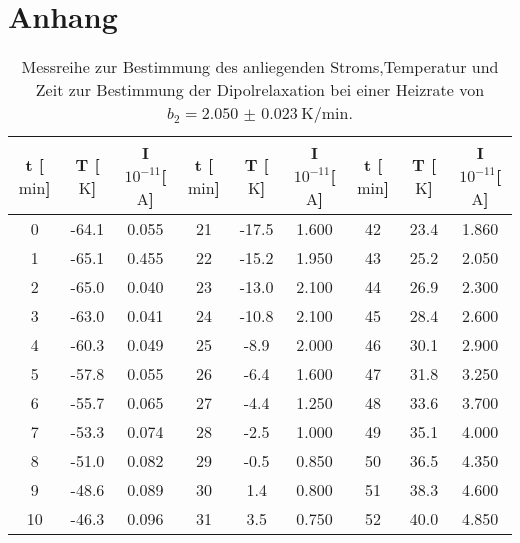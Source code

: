 \newpage
\section{Anhang}

\begin{table}
    \centering
    \caption{Messreihe zur Bestimmung des anliegenden Stroms,\newline Temperatur und Zeit zur Bestimmung der Dipolrelaxation bei einer Heizrate von $b_2 = \SI{2.050(23)}{\kelvin\per\minute}$.} 
    \label{tab:WhoIsBigInJapan?2}
    \begin{tabular}{c c c@{\hskip 0.5cm}||@{\hskip 0.5cm} c c c@{\hskip 0.5cm} ||@{\hskip 0.5cm} c c c}
        \toprule
        t [$\si{\minute}$] & T [$\si{\kelvin}$] &  I $10^{-11}$[$\si{\ampere}$] & t [$\si{\minute}$] & T [$\si{\kelvin}$] &  I $10^{-11}$[$\si{\ampere}$] & t [$\si{\minute}$] & T [$\si{\kelvin}$] &  I $10^{-11}$[$\si{\ampere}$] \\
        \midrule
0    & -64.1   &    0.055 & 21      &  -17.5     &  1.600  &  42  &      23.4  &           1.860 \\
1    & -65.1   &    0.455 & 22      &  -15.2     &  1.950 &  43  &      25.2  &           2.050 \\
2    & -65.0    &    0.040  & 23      &  -13.0       &  2.100  &  44  &      26.9  &           2.300 \\
3    & -63.0     &    0.041 & 24      &  -10.8     &  2.100  &  45  &      28.4  &           2.600  \\
4    & -60.3   &    0.049 & 25      &  -8.9      &  2.000    &  46  &      30.1  &           2.900  \\
5    & -57.8   &    0.055 & 26      &  -6.4      &  1.600  &  47  &      31.8  &           3.250 \\
6    & -55.7   &    0.065 & 27      &  -4.4      &  1.250 &  48  &      33.6  &           3.700  \\
7    & -53.3   &    0.074 & 28      &  -2.5      &  1.000    &  49  &      35.1  &           4.000    \\
8    & -51.0   &    0.082 & 29      &  -0.5      &  0.850 &  50  &      36.5  &           4.350 \\
9    & -48.6   &    0.089 & 30      &  1.4       & 0.800   &  51  &      38.3  &           4.600 \\
10   & -46.3   &    0.096 & 31      &  3.5       & 0.750  &  52  &      40.0    &           4.850 \\

\end{tabular}
\end{table}
